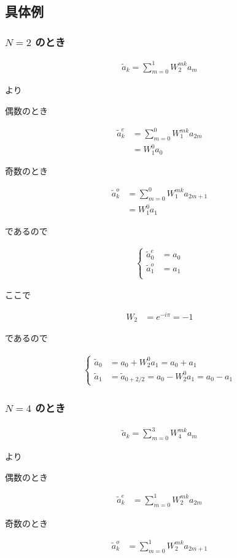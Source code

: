 \subsection{具体例}

\subsubsection{$N = 2$ のとき}

\begin{align}
    \tilde{a}_k = \sum_{m = 0}^1 W_2^{mk} a_m
\end{align}

より

偶数のとき

\begin{align*}
    \tilde{a}_k^{e} &= \sum_{m = 0}^0 W_1^{mk} a_{2m} \\
                    &= W_1^0 a_0
\end{align*}

奇数のとき

\begin{align*}
    \tilde{a}_k^{o} &= \sum_{m = 0}^0 W_1^{mk} a_{2m + 1} \\
                    &= W_1^0 a_1
\end{align*}

であるので

\begin{align}
    \begin{cases}
        \tilde{a}_0^{e} &= a_0 \\
        \tilde{a}_1^{o} &= a_1 \\
    \end{cases}
\end{align}

ここで

\begin{align*}
    W_2 &= e^{-i\pi} = -1
\end{align*}

であるので

\begin{align}
    \begin{cases}
        \tilde{a}_0 &= a_0 + W_2^0 a_1 = a_0 + a_1 \\
        \tilde{a}_1 &= \tilde{a}_{0 + 2/2} = a_0 - W_2^0 a_1 = a_0 - a_1
    \end{cases}
\end{align}

\subsubsection{$N = 4$ のとき}

\begin{align}
    \tilde{a}_k = \sum_{m = 0}^3 W_4^{mk} a_m
\end{align}

より

偶数のとき

\begin{align*}
    \tilde{a}_k^{e} &= \sum_{m = 0}^1 W_2^{mk} a_{2m}
\end{align*}

奇数のとき

\begin{align*}
    \tilde{a}_k^{o} &= \sum_{m = 0}^1 W_2^{mk} a_{2m + 1}
\end{align*}
